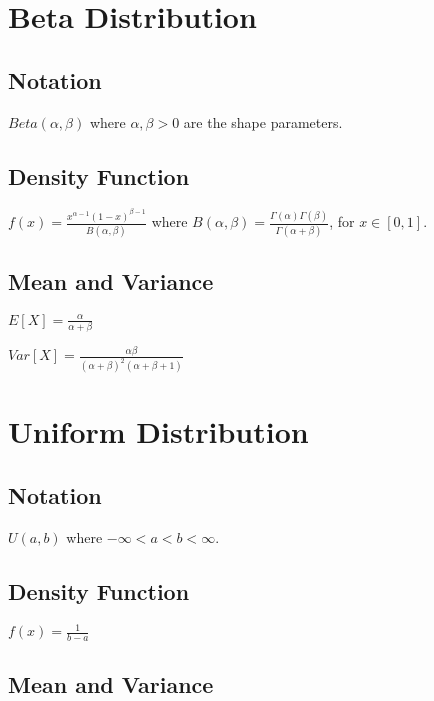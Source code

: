 \documentclass{article}
\begin{document}
\begin{multicols*}{2}

\section{Beta Distribution}
\label{sec:beta-dist}

\subsection{Notation}

$Beta(\alpha, \beta)$ where $\alpha,\beta > 0$ are the shape parameters.

\subsection{Density Function}

$f(x) = \frac{x^{\alpha - 1} (1 - x)^{\beta - 1}}{B(\alpha,\beta)}$ where $B(\alpha, \beta) = \frac{\Gamma(\alpha)\Gamma(\beta)}{\Gamma(\alpha + \beta)}$, for $x \in [0, 1]$.

\subsection{Mean and Variance}

$E[X] = \frac{\alpha}{\alpha + \beta}$

$Var[X] = \frac{\alpha \beta}{(\alpha + \beta)^2(\alpha + \beta + 1)}$

\section{Uniform Distribution}
\label{sec:uniform-dist}

\subsection{Notation}

$U(a,b)$ where $-\infty < a < b < \infty$.

\subsection{Density Function}

$f(x) = \frac{1}{b - a}$

\subsection{Mean and Variance}


\end{multicols*}
\end{document}
